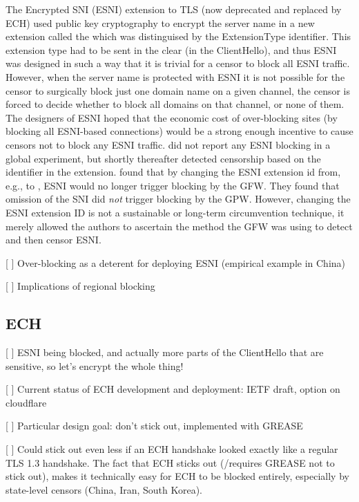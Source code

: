 The Encrypted SNI (ESNI) extension to TLS (now deprecated and replaced by ECH) used public key cryptography to encrypt the server name in a new extension called the  which was distinguised by the  ExtensionType identifier. This extension type had to be sent in the clear (in the ClientHello), and thus ESNI was designed in such a way that it is trivial for a censor to block all ESNI traffic. However, when the server name is protected with ESNI it is not possible for the censor to surgically block just one domain name on a given channel, the censor is forced to decide whether to block all domains on that channel, or none of them. The designers of ESNI hoped that the economic cost of over-blocking sites (by blocking all ESNI-based connections) would be a strong enough incentive to cause censors not to block any ESNI traffic. \cite{chai2019importance} did not report any ESNI blocking in a global experiment, but shortly thereafter  detected censorship based on the  identifier in the  extension.  found that by changing the ESNI extension id from, e.g.,  to , ESNI would no longer trigger blocking by the GFW. They found that omission of the SNI did {\em not} trigger blocking by the GPW. However, changing the ESNI extension ID is not a sustainable or long-term circumvention technique, it merely allowed the authors to ascertain the method the GFW was using to detect and then censor ESNI.

[ ] Over-blocking as a deterent for deploying ESNI (empirical example in China)

[ ] Implications of regional blocking
\subsection{ECH}

[ ] ESNI being blocked, and actually more parts of the ClientHello that are sensitive, so let's encrypt the whole thing!

[ ] Current status of ECH development and deployment: IETF draft, option on cloudflare

[ ] Particular design goal: don't stick out, implemented with GREASE

[ ] Could stick out even less if an ECH handshake looked exactly like a regular TLS 1.3 handshake. The fact that ECH sticks out (/requires GREASE not to stick out), makes it technically easy for ECH to be blocked entirely, especially by state-level censors (China, Iran, South Korea).

